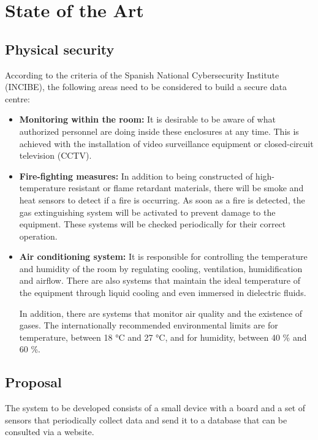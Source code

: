 \section{State of the Art}\label{sec:state-of-the-art}
\subsection{Physical security}\label{subsec:physical-security}
According to the criteria of the Spanish National Cybersecurity Institute (INCIBE), the following areas need to be considered to build a secure data centre:
\begin{itemize}
	\item \textbf{Monitoring within the room:} It is desirable to be aware of what authorized personnel are doing inside these enclosures at any time. This is achieved with the installation of video surveillance equipment or closed-circuit television (CCTV).
	\item \textbf{Fire-fighting measures:} In addition to being constructed of high-temperature resistant or flame retardant materials, there will be smoke and heat sensors to detect if a fire is occurring. As soon as a fire is detected, the gas extinguishing system will be activated to prevent damage to the equipment. These systems will be checked periodically for their correct operation.
	\item \textbf{Air conditioning system:} It is responsible for controlling the temperature and humidity of the room by regulating cooling, ventilation, humidification and airflow. There are also systems that maintain the ideal temperature of the equipment through liquid cooling and even immersed in dielectric fluids.

	In addition, there are systems that monitor air quality and the existence of gases. The internationally recommended environmental limits are for temperature, between 18 °C and 27 °C, and for humidity, between 40 \% and 60 \%.
\end{itemize}

\subsection{Proposal}\label{subsec:proposal}
The system to be developed consists of a small device with a board and a set of sensors that periodically collect data and send it to a database that can be consulted via a website.

